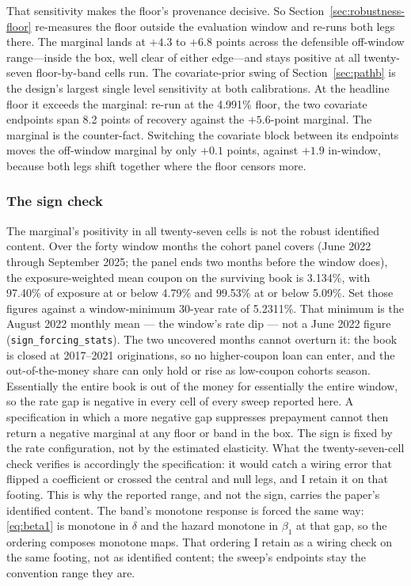 \documentclass[12pt]{article}
\begin{document}
That sensitivity makes the floor's provenance decisive. So Section~\ref{sec:robustness-floor} re-measures the floor outside the evaluation window and re-runs both legs there. The marginal lands at $+4.3$ to $+6.8$ points across the defensible off-window range---inside the box, well clear of either edge---and stays positive at all twenty-seven floor-by-band cells run. The covariate-prior swing of Section~\ref{sec:pathb} is the design's largest single level sensitivity at both calibrations. At the headline floor it exceeds the marginal: re-run at the 4.991\% floor, the two covariate endpoints span 8.2 points of recovery against the $+5.6$-point marginal. The marginal is the counter-fact. Switching the covariate block between its endpoints moves the off-window marginal by only $+0.1$ points, against $+1.9$ in-window, because both legs shift together where the floor censors more.

\subsubsection{The sign check}

The marginal's positivity in all twenty-seven cells is not the robust identified content. Over the forty window months the cohort panel covers (June 2022 through September 2025; the panel ends two months before the window does), the exposure-weighted mean coupon on the surviving book is 3.134\%, with 97.40\% of exposure at or below 4.79\% and 99.53\% at or below 5.09\%. Set those figures against a window-minimum 30-year rate of 5.2311\%. That minimum is the August 2022 monthly mean --- the window's rate dip --- not a June 2022 figure (\texttt{sign\_forcing\_stats}). The two uncovered months cannot overturn it: the book is closed at 2017--2021 originations, so no higher-coupon loan can enter, and the out-of-the-money share can only hold or rise as low-coupon cohorts season. Essentially the entire book is out of the money for essentially the entire window, so the rate gap is negative in every cell of every sweep reported here. A specification in which a more negative gap suppresses prepayment cannot then return a negative marginal at any floor or band in the box. The sign is fixed by the rate configuration, not by the estimated elasticity. What the twenty-seven-cell check verifies is accordingly the specification: it would catch a wiring error that flipped a coefficient or crossed the central and null legs, and I retain it on that footing. This is why the reported range, and not the sign, carries the paper's identified content. The band's monotone response is forced the same way: \eqref{eq:beta1} is monotone in $\delta$ and the hazard monotone in $\beta_1$ at that gap, so the ordering composes monotone maps. That ordering I retain as a wiring check on the same footing, not as identified content; the sweep's endpoints stay the convention range they are.
\end{document}
